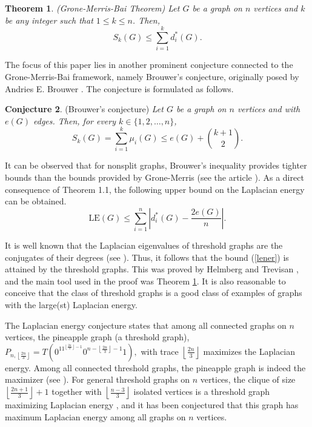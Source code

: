 \documentclass[12pt]{article}
\theoremstyle{plain}
\newtheorem{theorem}{Theorem}[section]
\theoremstyle{definition}
\newtheorem{Conjecture}[theorem]{Conjecture}
\begin{document}
\begin{theorem} \label{groneme} {\rm (Grone-Merris-Bai Theorem) } 
Let $G$ be a graph on $n$ vertices and $k$ be any integer such that $1 \leq k \leq n$. Then, 
$$S_k(G)\leq \sum_{i=1}^{k} d_i^*(G).$$
\end{theorem}
The focus of this paper lies in another prominent conjecture connected to the Grone-Merris-Bai framework, namely Brouwer’s conjecture, originally posed by Andries E. Brouwer \cite{Brouwer2012}. The conjecture is formulated as follows.
\begin{Conjecture} {(Brouwer's conjecture)}
{\em Let $G$ be a graph on $n$ vertices and with $e(G)$ edges. Then, for every $k\in\{1, 2, \ldots, n\}$, 
$$S_k(G)=\sum_{i=1}^{k} \mu_i(G)\leq e(G)+\binom{k+1}{2}.$$}
\end{Conjecture} 
It can be observed that for nonsplit graphs, Brouwer’s inequality provides tighter bounds than the bounds provided by Grone-Merris \cite{Grone1994} (see the article \cite{Mayank2010}). As a direct consequence of Theorem 1.1, the following upper bound on the Laplacian energy can be obtained.
\begin{equation}\label{lener}
\mathrm{LE}(G)\leq \sum_{i=1}^{n}\left|d_i^*(G)-\frac{2e(G)}{n}\right|.
\end{equation}

It is well known that the Laplacian eigenvalues of threshold graphs are the conjugates of their degrees (see \cite{Merris1994}). Thus, it follows that the bound (\ref{lener}) is attained by the threshold graphs. This was proved by Helmberg and Trevisan \cite{Helm2015}, and the main tool used in the proof was Theorem \ref{groneme}. It is also reasonable to conceive that the class of threshold graphs is a good class of examples of graphs with the large(st) Laplacian energy. 

The Laplacian energy conjecture \cite{Vina2013} states that among all connected graphs on $n$ vertices, the pineapple graph (a threshold graph), $P_{n,\left\lfloor \frac{2n}{3} \right\rfloor}=T(0^11^{\left\lfloor \frac{2n}{3} \right\rfloor-1}0^{n-\left\lfloor \frac{2n}{3} \right\rfloor-1}1),$ with trace $\left\lfloor \frac{2n}{3}\right\rfloor$ maximizes the Laplacian energy. Among all connected threshold graphs, the pineapple graph is indeed the maximizer (see \cite{Helm2015}). For general threshold graphs on $n$ vertices, the clique of size $\left\lfloor \frac{2n+1}{3} \right\rfloor+1$ together with $\left\lfloor \frac{n-3}{3} \right\rfloor$ isolated vertices is a threshold graph maximizing Laplacian energy \cite{Helm2015}, and it has been conjectured that this graph has maximum Laplacian energy among all graphs on $n$ vertices. 
\end{document}
